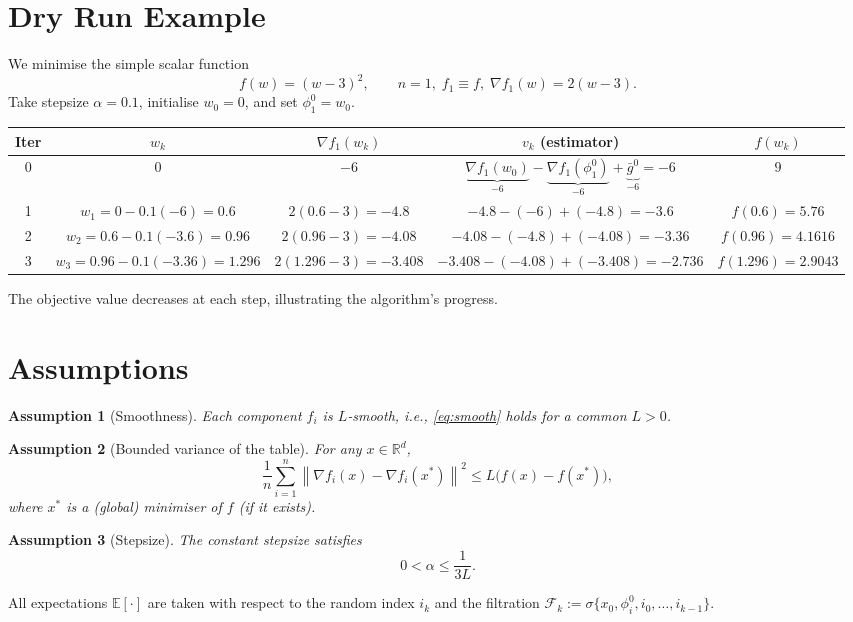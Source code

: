 \documentclass{article}
\newtheorem{assumption}{Assumption}
\newcommand{\E}{\mathbb{E}}
\newcommand{\R}{\mathbb{R}}
\newcommand{\norm}[1]{\left\|#1\right\|}
\newcommand{\grad}{\nabla}
\begin{document}
\section*{Dry Run Example}
We minimise the simple scalar function
\[
f(w)=(w-3)^2,\qquad
n=1,\; f_1\equiv f,\;
\grad f_1(w)=2(w-3).
\]
Take stepsize $\alpha=0.1$, initialise $w_0=0$, and set $\phi_1^{0}=w_0$.

\begin{center}
\begin{tabular}{c|c|c|c|c}
\textbf{Iter} & $w_k$ & $\grad f_1(w_k)$ & $v_k$ (estimator) & $f(w_k)$\\ \hline
0 & $0$ & $-6$ &
$\underbrace{\grad f_1(w_0)}_{-6}
-\underbrace{\grad f_1(\phi_1^{0})}_{-6}
+\underbrace{\bar g^{0}}_{-6}= -6$ &
$9$\\ \hline
1 & $w_1=0-0.1(-6)=0.6$ &
$2(0.6-3)=-4.8$ &
$-4.8-(-6)+(-4.8) = -3.6$ &
$f(0.6)=5.76$\\ \hline
2 & $w_2=0.6-0.1(-3.6)=0.96$ &
$2(0.96-3)=-4.08$ &
$-4.08-(-4.8)+(-4.08)= -3.36$ &
$f(0.96)=4.1616$\\ \hline
3 & $w_3=0.96-0.1(-3.36)=1.296$ &
$2(1.296-3)=-3.408$ &
$-3.408-(-4.08)+(-3.408)= -2.736$ &
$f(1.296)=2.9043$
\end{tabular}
\end{center}
The objective value decreases at each step, illustrating the algorithm’s progress.

\newpage
\section*{Assumptions}
\begin{assumption}[Smoothness]\label{ass:smooth}
Each component $f_i$ is $L$‑smooth, i.e., \eqref{eq:smooth} holds for a common $L>0$.
\end{assumption}
\begin{assumption}[Bounded variance of the table]\label{ass:bounded}
For any $x\in\R^{d}$,
\[
\frac1n\sum_{i=1}^{n}\norm{\grad f_i(x)-\grad f_i(x^{*})}^{2}
\le L\bigl(f(x)-f(x^{*})\bigr),
\]
where $x^{*}$ is a (global) minimiser of $f$ (if it exists).  
\end{assumption}
\begin{assumption}[Stepsize]\label{ass:stepsize}
The constant stepsize satisfies
\[
0<\alpha\le\frac{1}{3L}.
\]
\end{assumption}
All expectations $\E[\cdot]$ are taken with respect to the random index $i_k$ and the
filtration $\mathcal{F}_k:=\sigma\{x_0,\phi_i^0, i_0,\dots,i_{k-1}\}$.
\end{document}
